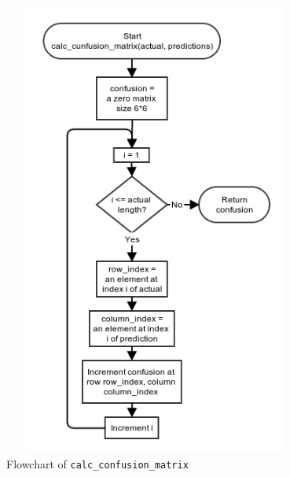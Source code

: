 \documentclass[10pt,a4paper]{article}
\begin{document}
\begin{figure}[!ht]
	\centering
	\includegraphics[height=15cm, width=10cm]{images/flow_chart/calc_confusion_matrix.png}
	\caption{Flowchart of \tt{calc\_confusion\_matrix}}
	\label{fig:calc_confusion_matrix}
\end{figure}
\end{document}
